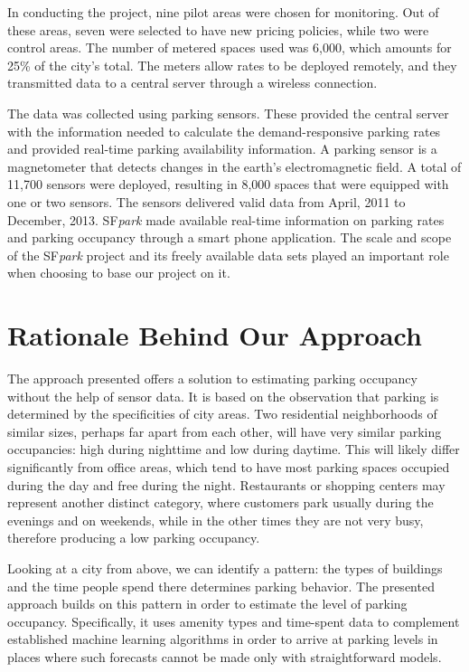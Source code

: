 	In conducting the project, nine pilot areas were chosen for monitoring. Out of these areas, seven were selected to have new pricing policies, while two were control areas. The number of metered spaces used was 6,000, which amounts for 25\% of the city's total. The meters allow rates to be deployed remotely, and they transmitted data to a central server through a wireless connection.
	
	The data was collected using parking sensors. These provided the central server with the information needed to calculate the demand-responsive parking rates and provided real-time parking availability information. A parking sensor is a magnetometer that detects changes in the earth's electromagnetic field. A total of 11,700 sensors were deployed, resulting in 8,000 spaces that were equipped with one or two sensors. The sensors delivered valid data from April, 2011 to December, 2013. SF\textit{park} made available real-time information on parking rates and parking occupancy through a smart phone application. The scale and scope of the SF\textit{park} project and its freely available data sets played an important role when choosing to base our project on it.
	
	\section{Rationale Behind Our Approach}
	The approach presented offers a solution to estimating parking occupancy without the help of sensor data. It is based on the observation that parking is determined by the specificities of city areas. Two residential neighborhoods of similar sizes, perhaps far apart from each other, will have very similar parking occupancies: high during nighttime and low during daytime. This will likely differ significantly from office areas, which tend to have most parking spaces occupied during the day and free during the night. Restaurants or shopping centers may represent another distinct category, where customers park usually during the evenings and on weekends, while in the other times they are not very busy, therefore producing a low parking occupancy.
	
	Looking at a city from above, we can identify a pattern: the types of buildings and the time people spend there determines parking behavior. The presented approach builds on this pattern in order to estimate the level of parking occupancy. Specifically, it uses amenity types and time-spent data to complement established machine learning algorithms in order to arrive at parking levels in places where such forecasts cannot be made only with straightforward models.
	

